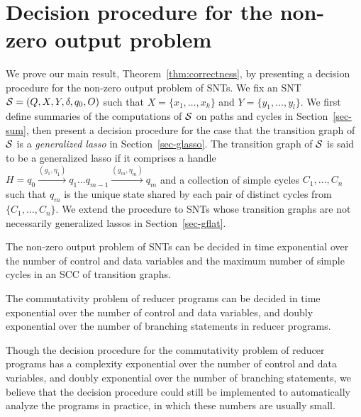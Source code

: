 
\section{Decision procedure for the non-zero output problem}\label{sec:dec-snt}
%
We prove our main result, Theorem~\ref{thm:correctness}, by presenting a decision procedure for the non-zero output problem of SNTs. We fix an SNT ${\mathcal{S} } = (Q,X,Y,\delta,q_0,O)$ such that $X=\{ x_1,\dots, x_k\}$ and $Y = \{y_1,\dots,y_l\}$. 
We first define summaries of the computations of ${\mathcal{S} }$ on paths and cycles in Section~\ref{sec-sum}, then present a decision procedure for the case that the transition graph of ${\mathcal{S} }$ is a \emph{generalized lasso} in Section~\ref{sec-glasso}. The transition graph of ${\mathcal{S} }$ is said to be a generalized lasso if it comprises a handle $H=q_0 \xrightarrow{(g_1,\eta_1)} q_1 \dots q_{m-1} \xrightarrow{(g_m,\eta_m)} q_{m}$ and a collection of simple cycles $C_1,\dots,C_n$ such that $q_m$ is the unique state shared by each pair of distinct cycles from $\{C_1,\dots,C_n\}$. We extend the procedure to SNTs whose transition graphs are not necessarily generalized lassos  in Section~\ref{sec-gflat}. 


\begin{theorem}\label{thm:correctness}
The non-zero output problem of SNTs can be decided in time exponential over the number of control and data variables and the maximum number of simple cycles in an SCC of transition graphs.
\end{theorem}
\vspace{-2mm}

\begin{corollary}\label{cor:snt-dec-proc}
The commutativity problem of  reducer programs can be decided in time exponential over the number of control and data variables, and doubly exponential over the number of branching statements in reducer programs. 
\end{corollary}

\begin{remark}
Though the decision procedure for the commutativity problem of reducer programs has a complexity exponential over the number of control and data variables, and doubly exponential over the number of branching statements, we believe that the decision procedure could still be implemented to automatically analyze the programs in practice, in which these numbers are usually small. 
\end{remark}




